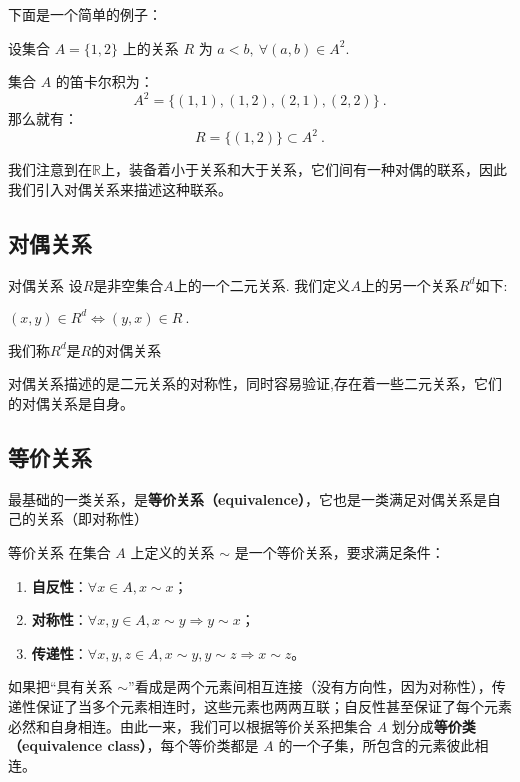 下面是一个简单的例子：

\begin{example}{}
设集合 $A=\{1,2\}$ 上的关系 $R$ 为 $a<b,\ \forall (a,b)\in A^2$.

集合 $A$ 的笛卡尔积为：
\begin{equation}
A^2 = \{(1,1),(1,2),(2,1),(2,2)\}~.
\end{equation}
那么就有：
\begin{equation}
R=\{(1,2)\}\subset A^2~.
\end{equation}

\end{example}

我们注意到在$\mathbb{R}$上，装备着小于关系和大于关系，它们间有一种对偶的联系，因此我们引入对偶关系来描述这种联系。

\subsection{对偶关系}
\begin{definition}{对偶关系}
设$R$是非空集合$A$上的一个二元关系. 我们定义$A$上的另一个关系$R^{d}$如下:

$(x, y) \in R^{d} \Leftrightarrow(y, x) \in R~.$

我们称$R^{d}$是$R$的对偶关系

\end{definition}
对偶关系描述的是二元关系的对称性，同时容易验证,存在着一些二元关系，它们的对偶关系是自身。

\subsection{等价关系}\label{sub_Relat_1}

最基础的一类关系，是\textbf{等价关系（equivalence）}，它也是一类满足对偶关系是自己的关系（即对称性） 
\begin{definition}{等价关系}\label{def_Relat_1}
在集合 $A$ 上定义的关系 $\sim$ 是一个等价关系，要求满足条件：
\begin{enumerate}
\item \textbf{自反性}：$\forall x\in A, x\sim x$；
\item \textbf{对称性}：$\forall x, y\in A, x\sim y \Rightarrow y\sim x$；
\item \textbf{传递性}：$\forall x, y, z\in A, x\sim y, y\sim z\Rightarrow x\sim z$。
\end{enumerate}
\end{definition}
如果把“具有关系 $\sim$”看成是两个元素间相互连接（没有方向性，因为对称性），传递性保证了当多个元素相连时，这些元素也两两互联；自反性甚至保证了每个元素必然和自身相连。由此一来，我们可以根据等价关系把集合 $A$ 划分成\textbf{等价类（equivalence class）}，每个等价类都是 $A$ 的一个子集，所包含的元素彼此相连。

